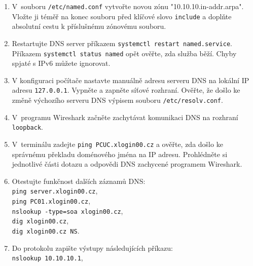 \documentclass[a4paper,11pt]{article}
\begin{document}
\begin{enumerate}
  \item V~souboru {\tt /etc/named.conf} vytvořte novou zónu "10.10.10.in-addr.arpa". Vložte ji téměř na konec souboru před klíčové slovo {\tt include} a doplňte absolutní cestu k příslušnému zónovému souboru.
  
  \item Restartujte DNS server příkazem {\tt systemctl restart named.service}.
    Příkazem {\tt systemctl status named} opět ověřte, zda služba běží. Chyby spjaté s IPv6 můžete ignorovat.

  \item V konfiguraci počítače nastavte manuálně adresu serveru DNS na lokální IP adresu {\tt 127.0.0.1}. Vypněte a zapněte síťové rozhraní. Ověřte, že došlo ke změně výchozího serveru DNS výpisem souboru {\tt /etc/resolv.conf}.
  \item V~programu Wireshark začněte zachytávat  komunikaci DNS na rozhraní {\tt loopback}.
  \item V~terminálu zadejte {\tt ping PCUC.xlogin00.cz} a ověřte, zda došlo ke správnému překladu doméno\-vého jména na IP adresu. Prohlédněte si jednotlivé části dotazu a odpovědi DNS zachycené programem Wireshark.
  \item Otestujte funkčnost dalších záznamů DNS:\\
    {\tt ping server.xlogin00.cz},\\
    {\tt ping PC01.xlogin00.cz},\\
    {\tt nslookup -type=soa xlogin00.cz},\\
    {\tt dig xlogin00.cz},\\
    {\tt dig xlogin00.cz NS}. 
  \item Do protokolu zapište výstupy následujících příkazu:\\
    {\tt nslookup 10.10.10.1},\\

\end{enumerate}
\end{document}
